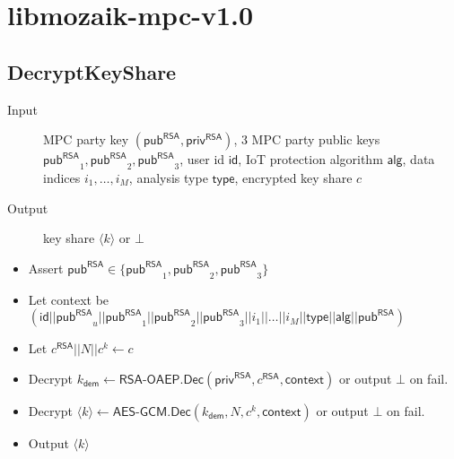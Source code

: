 \documentclass[10pt,a4paper]{article}
\newcommand{\pub}{\ensuremath{\mathsf{pub}}}
\newcommand{\priv}{\ensuremath{\mathsf{priv}}}
\newcommand{\pubRSA}{\ensuremath{\pub^{\mathsf{RSA}}}}
\newcommand{\privRSA}{\ensuremath{\priv^{\mathsf{RSA}}}}
\newcommand{\id}{\ensuremath{\mathsf{id}}}
\newcommand{\type}{\ensuremath{\mathsf{type}}}
\newcommand{\alg}{\ensuremath{\mathsf{alg}}}
\newcommand{\kdem}{\ensuremath{k_{\mathsf{dem}}}}
\newcommand{\share}[1]{\ensuremath{\langle #1 \rangle}}
\newcommand{\RSAOAEP}{\ensuremath{\textsf{RSA-OAEP}}}
\newcommand{\AESGCM}{\ensuremath{\textsf{AES-GCM}}}
\newcommand{\Decrypt}{\ensuremath{\textsf{Dec}}}
\begin{document}
{\color{gray}
\section{libmozaik-mpc-v1.0}

\subsection{DecryptKeyShare}
\begin{description}
	\item[Input] MPC party key $(\pubRSA,\privRSA)$, 3 MPC party public keys $\pubRSA_1, \pubRSA_2, \pubRSA_3$, user id $\id$, IoT protection algorithm $\alg$, data indices $i_1, \dots, i_M$, analysis type $\type$, encrypted key share $c$
	\item[Output] key share $\share{k}$ or $\bot$
\end{description}
\begin{itemize}
	\item Assert $\pubRSA \in \{\pubRSA_1, \pubRSA_2, \pubRSA_3\}$
	\item Let context be $(\id||\pubRSA_u||\pubRSA_1||\pubRSA_2||\pubRSA_3||i_1||\dots||i_M||\type||\alg||\pubRSA)$
	\item Let $c^{\mathsf{RSA}}||N||c^k \gets c$
	\item Decrypt $\kdem \gets \RSAOAEP.\Decrypt(\privRSA,c^{\mathsf{RSA}},\mathsf{context})$ or output  $\bot$ on fail.
	\item Decrypt $\share{k} \gets \AESGCM.\Decrypt(\kdem,N,c^k,\mathsf{context})$ or output  $\bot$ on fail.
	\item Output $\share{k}$
\end{itemize}

}
\end{document}
